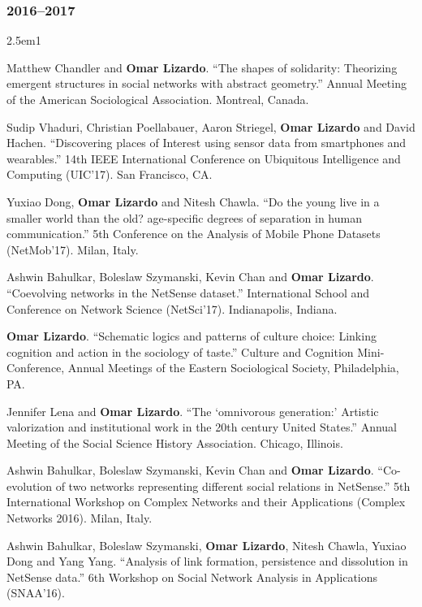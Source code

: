 \documentclass[
]{article}
\newenvironment{cventry}{\begin{hangparas}{2.5em}{1}}{\end{hangparas}}
\begin{document}
\subsubsection{2016--2017}\label{section-27}

\begin{cventry}

Matthew Chandler and \textbf{Omar Lizardo}. ``The shapes of solidarity:
Theorizing emergent structures in social networks with abstract
geometry.'' Annual Meeting of the American Sociological Association.
Montreal, Canada.

Sudip Vhaduri, Christian Poellabauer, Aaron Striegel, \textbf{Omar
Lizardo} and David Hachen. ``Discovering places of Interest using sensor
data from smartphones and wearables.'' 14th IEEE International
Conference on Ubiquitous Intelligence and Computing (UIC'17). San
Francisco, CA.

Yuxiao Dong, \textbf{Omar Lizardo} and Nitesh Chawla. ``Do the young
live in a smaller world than the old? age-specific degrees of separation
in human communication.'' 5th Conference on the Analysis of Mobile Phone
Datasets (NetMob'17). Milan, Italy.

Ashwin Bahulkar, Boleslaw Szymanski, Kevin Chan and \textbf{Omar
Lizardo}. ``Coevolving networks in the NetSense dataset.'' International
School and Conference on Network Science (NetSci'17). Indianapolis,
Indiana.

\textbf{Omar Lizardo}. ``Schematic logics and patterns of culture
choice: Linking cognition and action in the sociology of taste.''
Culture and Cognition Mini-Conference, Annual Meetings of the Eastern
Sociological Society, Philadelphia, PA.

Jennifer Lena and \textbf{Omar Lizardo}. ``The `omnivorous generation:'
Artistic valorization and institutional work in the 20th century United
States.'' Annual Meeting of the Social Science History Association.
Chicago, Illinois.

Ashwin Bahulkar, Boleslaw Szymanski, Kevin Chan and \textbf{Omar
Lizardo}. ``Co-evolution of two networks representing different social
relations in NetSense.'' 5th International Workshop on Complex Networks
and their Applications (Complex Networks 2016). Milan, Italy.

Ashwin Bahulkar, Boleslaw Szymanski, \textbf{Omar Lizardo}, Nitesh
Chawla, Yuxiao Dong and Yang Yang. ``Analysis of link formation,
persistence and dissolution in NetSense data.'' 6th Workshop on Social
Network Analysis in Applications (SNAA'16).


\end{cventry}
\end{document}
